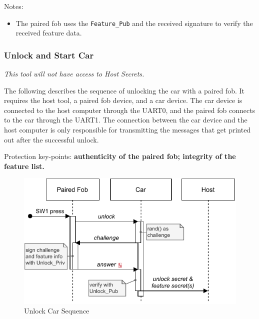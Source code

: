 \documentclass[11pt,oneside,onecolumn,letterpaper]{article}
\begin{document}
Notes:
\begin{itemize}
	\item The paired fob uses the \verb|Feature_Pub| and the received signature to verify the received feature data.
\end{itemize}

\subsubsection{Unlock and Start Car}

\textit{This tool will not have access to Host Secrets.}

The following describes the sequence of unlocking the car with a paired fob. It requires the host tool, a paired fob device, and a car device. The car device is connected to the host computer through the UART0, and the paired fob connects to the car through the UART1. The connection between the car device and the host computer is only responsible for transmitting the messages that get printed out after the successful unlock.

Protection key-points: \textbf{authenticity of the paired fob; integrity of the feature list.}

\begin{figure}[!htbp]
	\begin{centering}
		\includegraphics[width = .6\textwidth]{pic/unlock.pdf}
		\caption{Unlock Car Sequence}
		\label{fig:unlock}
	\end{centering}	
\end{figure}
\end{document}
